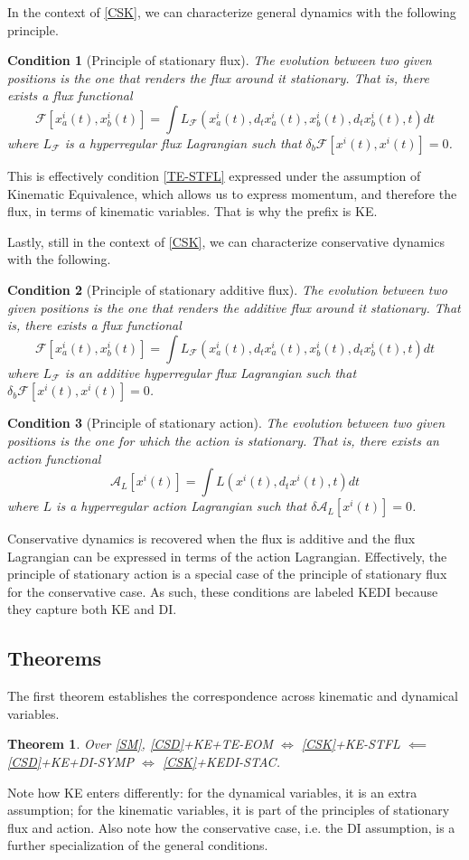 \documentclass[12pt]{article}
\newtheorem{theorem}{Theorem}
\newtheorem{condth}{Condition}
\renewcommand*{\thecondth}{\Roman{condth}}
\newenvironment{condition}[2][]{\renewcommand{\thecondth}{#2}\begin{condth}[#1]\label{#2}}{\end{condth}\renewcommand{\thecondth}{\Roman{condth}}}
\begin{document}
In the context of \ref{CSK}, we can characterize general dynamics with the following principle.
\begin{condition}[Principle of stationary flux]{KE-STFL}
	The evolution between two given positions is the one that renders the flux around it stationary. That is, there exists a flux functional $$\mathcal{F}[x^i_a(t), x^i_b(t)] = \int L_{\mathcal{F}}(x^i_a(t), d_t x^i_a(t), x^i_b(t), d_t x^i_b(t), t)dt$$ where $L_{\mathcal{F}}$ is a hyperregular flux Lagrangian such that  $\delta_b \mathcal{F}[x^i(t),x^i(t)] = 0$.
\end{condition}
This is effectively condition \ref{TE-STFL} expressed under the assumption of Kinematic Equivalence, which allows us to express momentum, and therefore the flux, in terms of kinematic variables. That is why the prefix is KE.

Lastly, still in the context of \ref{CSK}, we can characterize conservative dynamics with the following.
\begin{condition}[Principle of stationary additive flux]{KEDI-STFL}
	The evolution between two given positions is the one that renders the additive flux around it stationary. That is, there exists a flux functional $$\mathcal{F}[x^i_a(t), x^i_b(t)] = \int L_{\mathcal{F}}(x^i_a(t), d_t x^i_a(t), x^i_b(t), d_t x^i_b(t), t)dt$$ where $L_{\mathcal{F}}$ is an additive hyperregular flux Lagrangian such that  $\delta_b \mathcal{F}[x^i(t),x^i(t)] = 0$.
\end{condition}
\begin{condition}[Principle of stationary action]{KEDI-STAC}
	The evolution between two given positions is the one for which the action is stationary. That is, there exists an action functional $$\mathcal{A}_L[x^i(t)] = \int L(x^i(t), d_t x^i(t), t)dt$$ where $L$ is a hyperregular action Lagrangian such that $\delta \mathcal{A}_L[x^i(t)] = 0$.
\end{condition}
Conservative dynamics is recovered when the flux is additive and the flux Lagrangian can be expressed in terms of the action Lagrangian. Effectively, the principle of stationary action is a special case of the principle of stationary flux for the conservative case. As such, these conditions are labeled KEDI because they capture both KE and DI.

\subsection{Theorems}

The first theorem establishes the correspondence across kinematic and dynamical variables.
\begin{theorem}\label{thrm:bridge}
	Over \ref{SM}, \ref{CSD}+KE+TE-EOM $\iff$ \ref{CSK}+KE-STFL $\impliedby$ \ref{CSD}+KE+DI-SYMP $\iff$ \ref{CSK}+KEDI-STAC.
\end{theorem}
Note how KE enters differently: for the dynamical variables, it is an extra assumption; for the kinematic variables, it is part of the principles of stationary flux and action. Also note how the conservative case, i.e. the DI assumption, is a further specialization of the general conditions.
\end{document}
